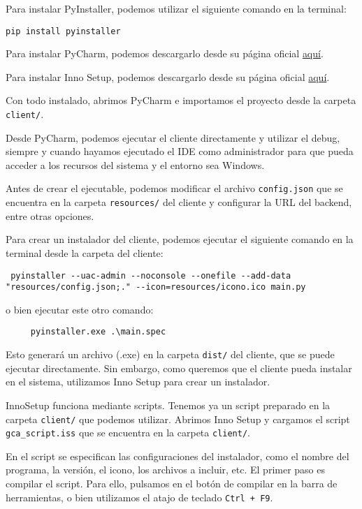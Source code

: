 Para instalar PyInstaller, podemos utilizar el siguiente comando en la terminal:
\begin{verbatim}
pip install pyinstaller
\end{verbatim}

Para instalar PyCharm, podemos descargarlo desde su página oficial \href{https://www.jetbrains.com/pycharm/download/}{aquí}.

Para instalar Inno Setup, podemos descargarlo desde su página oficial \href{https://jrsoftware.org/isinfo.php}{aquí}.

Con todo instalado, abrimos PyCharm e importamos el proyecto desde la carpeta \texttt{client/}.

Desde PyCharm, podemos ejecutar el cliente directamente y utilizar el debug, siempre y cuando hayamos ejecutado el IDE
como administrador para que pueda acceder a los recursos del sistema y el entorno sea Windows.

Antes de crear el ejecutable, podemos modificar el archivo \texttt{config.json} que se encuentra en la carpeta
\texttt{resources/} del cliente y configurar la URL del backend, entre otras opciones.

Para crear un instalador del cliente, podemos ejecutar el siguiente comando en la terminal desde la carpeta del cliente:
\begin{verbatim}
 pyinstaller --uac-admin --noconsole --onefile --add-data
"resources/config.json;." --icon=resources/icono.ico main.py
\end{verbatim}
o bien ejecutar este otro comando:
\begin{verbatim}
     pyinstaller.exe .\main.spec
\end{verbatim}

Esto generará un archivo (.exe) en la carpeta \texttt{dist/} del cliente, que se puede ejecutar directamente.
Sin embargo, como queremos que el cliente pueda instalar en el sistema, utilizamos Inno Setup para crear un instalador.

InnoSetup funciona mediante scripts.
Tenemos ya un script preparado en la carpeta \texttt{client/} que podemos utilizar.
Abrimos Inno Setup y cargamos el script \texttt{gca\_script.iss} que se encuentra en la carpeta \texttt{client/}.


En el script se especifican las configuraciones del instalador, como el nombre del programa, la versión,
el icono, los archivos a incluir, etc.
El primer paso es compilar el script.
Para ello, pulsamos en el botón de compilar en la barra de herramientas, o bien utilizamos el atajo de teclado \texttt{Ctrl + F9}.

